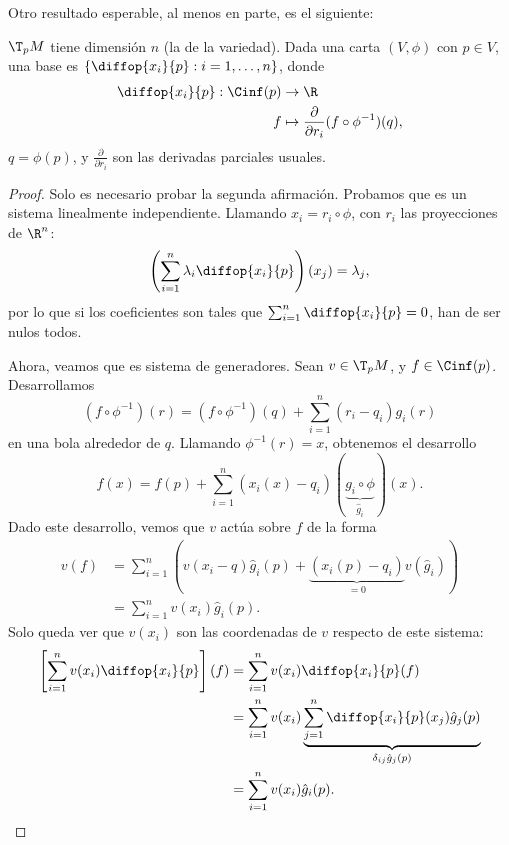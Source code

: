 Otro resultado esperable, al menos en parte, es el siguiente:
\begin{nth} \label{thm:base-parciales}
  $\T_{p}M$ tiene dimensión $n$ (la de la variedad). Dada una carta $(V,\phi)$
  con $p\in V$, una base es $\left\{ \diffop{x_{i}}{p} : i=1,\dots,n \right\}$, donde
  \begin{alignat*}{2}
    \diffop{x_{i}}{p}: \Cinf(p)  & \to \R \\
    f & \mapsto \frac{\partial}{\partial r_{i}}(f\circ \phi^{-1})(q),
  \end{alignat*}
  $q = \phi(p)$, y $\frac{\partial}{\partial r_{i}}$ son las derivadas parciales usuales.
\end{nth}
\begin{proof}
  Solo es necesario probar la segunda afirmación. Probamos que es un sistema
  linealmente independiente. Llamando $x_{i} = r_{i}\circ\phi$, con $r_{i}$ las
  proyecciones de $\R^{n}$:
  \[
    \left( \sum_{i=1}^{n} \lambda_{i} \diffop{x_{i}}{p} \right)(x_{j}) = \lambda_{j}
  ,\]
  por lo que si los coeficientes son tales que $\sum_{i=1}^{n} \diffop{x_{i}}{p}
  = 0$, han de ser nulos todos.

  Ahora, veamos que es sistema de generadores. Sean $v\in \T_{p}M$, y
  $f\in\Cinf(p)$. Desarrollamos
  \[
    (f\circ \phi^{-1})(r) = (f\circ \phi^{-1})(q) + \sum_{i=1}^{n}(r_{i}-q_{i})g_{i}(r)
  \]
  en una bola alrededor de $q$. Llamando $\phi^{-1}(r) = x$, obtenemos el
  desarrollo
  \[
    f(x) = f(p) + \sum_{i=1}^{n} (x_{i}(x) - q_{i})(\underbrace{g_{i}\circ\phi}_{\hat{g}_{i}})(x)
  .\]
  Dado este desarrollo, vemos que $v$ actúa sobre $f$ de la forma
  \begin{align*}
    v(f) & = \sum_{i=1}^{n}\left( v(x_{i}-q)\hat{g}_{i}(p) +
           \underbrace{(x_{i}(p) - q_{i})}_{=0}v(\hat{g}_{i}) \right) \\
    & = \sum_{i=1}^{n} v(x_{i})\hat{g}_{i}(p).
  \end{align*}
  Solo queda ver que $v(x_{i})$ son las coordenadas de $v$ respecto de este
  sistema:
  \begin{align*}
    \left[ \sum_{i=1}^{n} v(x_{i}) \diffop{x_{i}}{p} \right](f) & =
                                                                  \sum_{i=1}^{n}
                                                                  v(x_{i})
                                                                  \diffop{x_{i}}{p}(f)
    \\
    & = \sum_{i=1}^{n} v(x_{i}) \underbrace{\sum_{j=1}^{n} \diffop{x_{i}}{p}(x_{j})
    \hat{g}_{j}(p)}_{\delta_{ij}\hat{g}_{j}(p)} \\
    & = \sum_{i=1}^{n} v(x_{i})\hat{g}_{i}(p).
  \end{align*}
\end{proof}

